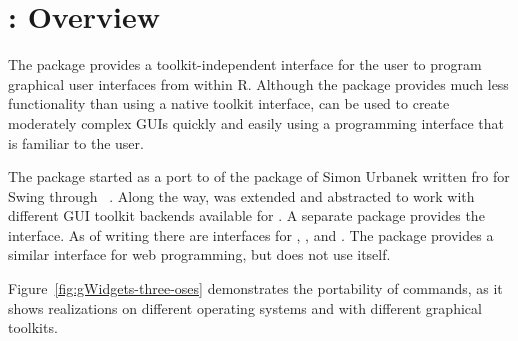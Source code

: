 






 
\newcommand{\ONLYIN}[1]{[only in #1]}

\chapter{: Overview}
\label{sec:overview}




The  package provides a toolkit-independent interface
for the \R\/ user to program graphical user interfaces from within
R. Although the package provides much less functionality than using a
native toolkit interface,  can be used to create
moderately complex GUIs quickly and easily using a programming
interface that is familiar to the \R\/ user.

The  package started as a port to  of the
 package of Simon Urbanek written fro 
for Swing through ~\citep{iWidgets}. Along the way,
 was extended and abstracted to work with different GUI
toolkit backends available for \R. A separate package provides the
interface. As of writing there are interfaces for ,
, and . The  package provides a
similar interface for web programming, but does not use 
itself.

Figure~\ref{fig:gWidgets-three-oses} demonstrates the portability of
 commands, as it shows realizations on different
operating systems and with different graphical toolkits.

